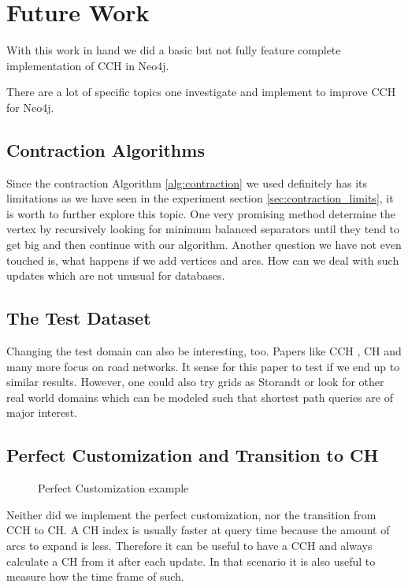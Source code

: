 \chapter{Future Work}

With this work in hand we did a basic but not fully feature complete implementation of CCH in Neo4j.

There are a lot of specific topics one investigate and implement to improve CCH for Neo4j.

\section{Contraction Algorithms}

Since the contraction Algorithm \ref{alg:contraction} we used definitely has its limitations as we have seen in the experiment section \ref{sec:contraction_limits}, it is worth to further explore this topic.
One very promising method determine the vertex by recursively looking for minimum balanced separators until they tend to get big and then continue with our algorithm.
Another question we have not even touched is, what happens if we add vertices and arcs.
How can we deal with such updates which are not unusual for databases.

\section{The Test Dataset}

Changing the test domain can also be interesting, too.
Papers like CCH \cite{CCH}, CH \cite{Geisberger_2012} and many more focus on road networks.
It sense for this paper to test if we end up to similar results.
However, one could also try grids as Storandt \cite{storandt2013contraction} or look for other real world domains which can be modeled such that shortest path queries are of major interest.

\section{Perfect Customization and Transition to CH}

\begin{wrapfigure}{r}{0.6\textwidth}
    \centering
    
    \caption{Perfect Customization example}
\end{wrapfigure}

Neither did we implement the perfect customization, nor the transition from CCH to CH.
A CH index is usually faster at query time because the amount of arcs to expand is less.
Therefore it can be useful to have a CCH and always calculate a CH from it after each update.
In that scenario it is also useful to measure how the time frame of such.

